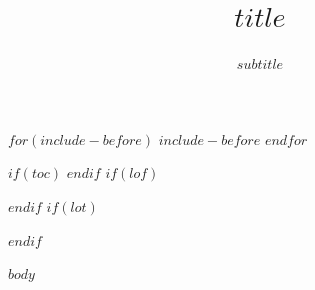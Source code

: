 \documentclass[
$if(papersize)$
  $papersize$paper,
$endif$
$for(classoption)$
  $classoption$$sep$,
$endfor$
]{amnestyreport}
\title{$title$}
\subtitle{$subtitle$}
\begin{document}
\frontmatter
\maketitle

$for(include-before)$
$include-before$
$endfor$

$if(toc)$
\tableofcontents
$endif$
$if(lof)$
\listoffigures
$endif$
$if(lot)$
\listoftables
$endif$
\mainmatter

$body$

\backmatter
\end{document}
